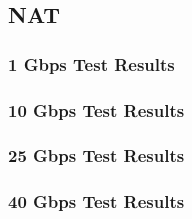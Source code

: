 \subsection{NAT}

\subsubsection{1 Gbps Test Results}
\subsubsection{10 Gbps Test Results}
\subsubsection{25 Gbps Test Results}
\subsubsection{40 Gbps Test Results}

